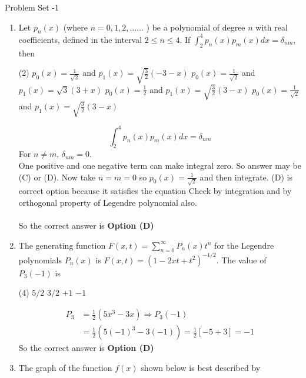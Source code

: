 
\begin{abox}
	Problem Set -1
\end{abox}
\begin{enumerate}[label=\color{ocre}\textbf{\arabic*.}]
	\item  Let $p_{n}(x)$ (where $n=0,1,2, \ldots \ldots$ ) be a polynomial of degree $n$ with real coefficients, defined in the interval $2 \leq n \leq 4$. If $\int_{2}^{4} p_{n}(x) p_{m}(x) d x=\delta_{n m}$, then
	{}
	\begin{tasks}(2)
		\task[\textbf{A.}] $p_{0}(x)=\frac{1}{\sqrt{2}}$ and $p_{1}(x)=\sqrt{\frac{3}{2}}(-3-x)$
		\task[\textbf{B.}]  $p_{0}(x)=\frac{1}{\sqrt{2}}$ and $p_{1}(x)=\sqrt{3}(3+x)$
		\task[\textbf{C.}] $p_{0}(x)=\frac{1}{2}$ and $p_{1}(x)=\sqrt{\frac{3}{2}}(3-x)$
		\task[\textbf{D.}] $p_{0}(x)=\frac{1}{\sqrt{2}}$ and $p_{1}(x)=\sqrt{\frac{3}{2}}(3-x)$
	\end{tasks}
	\begin{answer}
		$$\int_{2}^{4} p_{n}(x) p_{m}(x) d x=\delta_{n m}$$
		For $n\neq m$,  $\delta_{n m}=0$. \\ One positive and one negative term can make integral zero. So answer may be (C) or (D). Now take $n=m=0$ so $p_{0}(x)=\frac{1}{\sqrt{2}}$ and then integrate. (D) is correct option because it satisfies the equation Check by integration and by orthogonal property of Legendre polynomial also.\\\\
		So the correct answer is \textbf{Option (D)}
	\end{answer}
	\item  The generating function $F(x, t)=\sum_{n=0}^{\infty} P_{n}(x) t^{n}$ for the Legendre polynomials $P_{n}(x)$ is $F(x, t)=\left(1-2 x t+t^{2}\right)^{-1 / 2}$. The value of $P_{3}(-1)$ is
	{}
	\begin{tasks}(4)
		\task[\textbf{A.}] $5 / 2$
		\task[\textbf{B.}] $3 / 2$
		\task[\textbf{C.}] $+1$
		\task[\textbf{D.}] $-1$
	\end{tasks}
	\begin{answer}
		\begin{align*}
		P_{3}&=\frac{1}{2}\left(5 x^{3}-3 x\right) \Rightarrow P_{3}(-1)\\&=\frac{1}{2}\left(5(-1)^{3}-3(-1)\right)=\frac{1}{2}[-5+3]=-1
		\end{align*}
		So the correct answer is \textbf{Option (D)}
	\end{answer}
	\item  The graph of the function $f(x)$ shown below is best described by

\end{enumerate}
